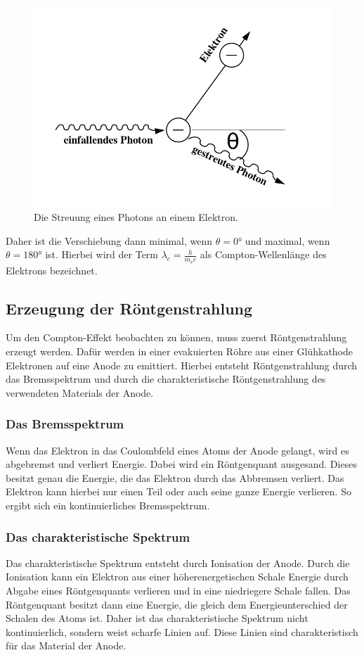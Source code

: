 \begin{figure}[H]
	\centering
	\includegraphics[scale=0.3]{content/comptoneffekt.png}
	\caption{Die Streuung eines Photons an einem Elektron.}
	\label{fig:StreuungPhoton}
\end{figure}
\noindent
Daher ist die Verschiebung dann minimal, wenn $\theta = 0 \si{\degree}$ und maximal, wenn $\theta = 180 \si{\degree}$ ist.
Hierbei wird der Term $\lambda_c = \frac{h}{m_e c}$ als Compton-Wellenlänge des Elektrons bezeichnet.

\subsection{Erzeugung der Röntgenstrahlung}
\label{sec:röntgenstr}
Um den Compton-Effekt beobachten zu können, muss zuerst Röntgenstrahlung erzeugt werden. Dafür werden in einer evakuierten Röhre aus einer Glühkathode Elektronen auf eine Anode zu emittiert.
Hierbei entsteht Röntgenstrahlung durch das Bremsspektrum und durch die charakteristische Röntgenstrahlung des verwendeten Materials der Anode.
\subsubsection{Das Bremsspektrum}
Wenn das Elektron in das Coulombfeld eines Atoms der Anode gelangt, wird es abgebremst und verliert Energie. Dabei wird ein Röntgenquant ausgesand. Dieses besitzt genau die Energie, die das Elektron durch das
Abbremsen verliert. Das Elektron kann hierbei nur einen Teil oder auch seine ganze Energie verlieren. So ergibt sich ein kontinuierliches Bremsspektrum.
\subsubsection{Das charakteristische Spektrum}
Das charakteristische Spektrum entsteht durch Ionisation der Anode. Durch die Ionisation kann ein Elektron aus einer höherenergetischen Schale Energie durch Abgabe eines Röntgenquants verlieren und in eine
niedriegere Schale fallen. Das Röntgenquant besitzt dann eine Energie, die gleich dem Energieunterschied der Schalen des Atoms ist. Daher ist das charakteristische Spektrum nicht kontinuierlich, sondern weist
scharfe Linien auf. Diese Linien sind charakteristisch für das Material der Anode.

